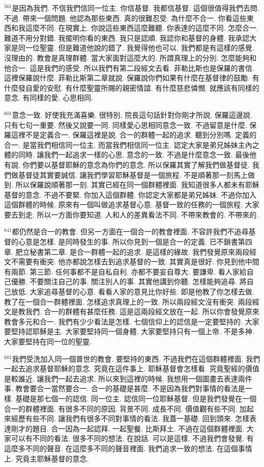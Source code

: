 \documentclass{book}
\begin{document}
$^{561}$是因為我們.
不信我們信同一位主.
你信基督.
我都信基督.
這個很值得我們去問.
不過.
帶來一個問題.
他認為那些東西.
真的很難忍受.
為什麼不合一.
你看這些東西和我這麼不同.
在現實上.
你說這些東西這麼難聽.
你表達的這麼不同.
怎麼合一.
難道不用分對錯.
我擺明你看的東西.
我只是認順.
我認你和基督的身體.
我承認大家是同一位聖靈.
但是難道他說的錯了.
我覺得他也可以.
我們都是有這樣的感覺.
沒理由的.
教會是真理群體.
當大家面對這麼大的.
所謂真理上的分別.
怎麼能夠和他合一.
這是我們的感受.
所以我們有第二段經文去看.
菲勒比斯也是保羅的書信.
這裡保羅說什麼.
菲勒比斯第二章就說.
保羅說你們如果有什麼在基督律的鼓勵.
有什麼發自愛的安慰.
有什麼聖靈所賜的親密情誼.
有什麼慈悲憐憫.
就應該有同樣的意念.
有同樣的愛.
心思相同.

$^{601}$意念一致.
好使我充滿喜樂.
很特別.
院長這句話針對你剛才所說.
保羅這邊說.
只有七句一重要.
然後又說要一同.
同樣愛心思相同意念一致.
不過留意是什麼.
保羅這裡不是定義合一.
保羅這裡是說.
合一的群體一起的追求.
聽到分別嗎.
定義的合一.
是當我們相信同一位主.
而當我們相信同一位主.
認定大家是弟兄姊妹主內之體的同時.
讓我們一起追求一樣的心思.
意念的一致.
不過是什麼意念一致.
最後他有說.
你們要以基督耶穌的意念為你們的意念.
所以保羅其實了解我們做基督徒.
我們做基督徒其實要誠信.
讓我們學習耶穌基督是一個旅程.
不是順著那一刻馬上做到.
所以保羅說順著那一刻.
其實已經在同一個群體裡面.
我知道很多人都未有耶穌基督的意念.
不過不要緊.
你加入這個群體.
你認定大家都是弟兄姊妹.
不過你加入這個群體的時候.
原來有一個叫做追求基督心意.
基督一致的任務的一個旅程.
大家要去到走.
所以一方面你要知道.
人和人的差異看法不同.
不帶來教會的.
不帶來的.

$^{641}$都仍然是合一的教會.
但另一方面在一個合一的教會裡面.
不容許我們不追尋基督的心意是怎樣.
是同時發生的事.
所以你見到一個是合一的定義.
已不鎖書第四章.
肥立秘書第二章.
是合一群體一起的追求.
是這樣的緣故.
我們發覺原來兩段經文不需要有衝突.
他亦都說怎樣去到追求基督的一致.
其實真是很好.
你見到他中間有兩節.
第三節.
任何事都不是自私自利.
亦都不要妄自尊大.
要謙卑.
看人家給自己優勝.
不要關注自己的事.
關注別人的事.
其實他講到你聽.
怎樣能夠追尋.
將自己放低.
大家追尋基督的心意.
看看人家的意見比你好些.
即是他教了你怎樣去做.
教了在一個合一群體裡面.
怎樣追求真理上的一致.
所以兩段經文沒有衝突.
兩段經文是教我們.
合一的群體有甚麼任務.
這是這兩段經文放在一起.
所以你會發覺原來教會多元和合一.
我們有少少看法是怎樣.
七個信仰上的認信是一定要堅持的.
大家要堅持認耶穌是主.
大家要堅持同一個身體.
大家要堅持只有一個上帝.
不是多神.
大家要堅持在同一位的聖靈.

$^{681}$我們受洗加入同一個普世的教會.
要堅持的東西.
不過我們在這個群體裡面.
我們一起去追求基督耶穌的意念.
究竟在這件事上.
耶穌基督會怎樣看.
究竟聖經的價值是較誰近.
讓我們一起去追求.
所以來到這裡的時候.
我想用一個圖畫去表達兩件事.
教會要合一當然要合一.
合一的基礎是甚麼.
不是因為我們對事情的看法是一樣.
基礎是那七個一的認信.
同一位主.
認信同一位耶穌基督.
但是我們發覺在一個合一的群體裡面.
有很多不同的原因.
背景不同.
成長不同.
價值觀有些不同.
加起來經歷有些不同.
讓我們有很多不同對事情的看法.
我蓋一基礎.
回到頭來.
怎樣表達剛才的題目.
合一因為一起認拜.
一起聖餐.
比斯拜土.
不過在這個群體裡面.
大家可以有不同的看法.
很多不同的想法.
在說話.
可以是這樣.
不過我們會發覺.
有這麼多不同的聲音.
在這麼多不同的聲音裡面.
我們追求一致的想法.
在這個事情上.
究竟主耶穌基督的意念.
\end{document}
